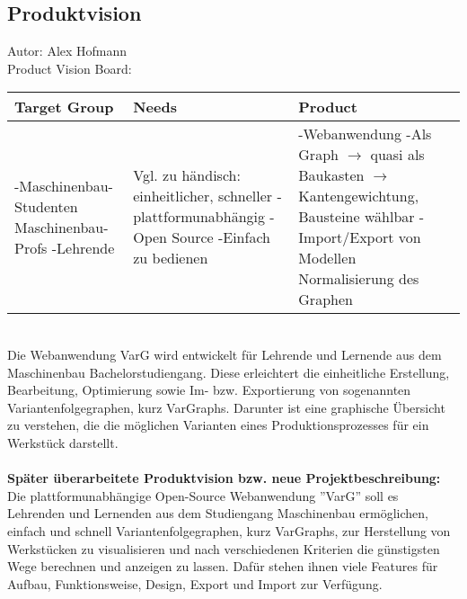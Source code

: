 \documentclass[twoside]{report}
\begin{document}
\subsection{Produktvision}
{\small Autor: Alex Hofmann}
\\

\noindent Product Vision Board: \\
\begin{tabular}{|p{50mm}|p{50mm}|p{50mm}|}
  \hline
  \textbf{Target Group}                                                  & \textbf{Needs}                                                                                                                        & \textbf{Product}                                                                                                                                                                                                 \\
  \hline
  -Maschinenbau-Studenten \newline Maschinenbau-Profs \newline -Lehrende & Vgl. zu händisch: \newline einheitlicher, schneller \newline -plattformunabhängig \newline -Open Source \newline -Einfach zu bedienen & -Webanwendung \newline -Als Graph \newline $\rightarrow$ quasi als Baukasten \newline $\rightarrow$ Kantengewichtung, Bausteine wählbar \newline -Import/Export von Modellen \newline Normalisierung des Graphen \\
  \hline
\end{tabular}
\\

\noindent Die Webanwendung VarG wird entwickelt für Lehrende und Lernende aus dem Maschinenbau Bachelorstudiengang.
Diese erleichtert die einheitliche Erstellung, Bearbeitung, Optimierung sowie Im- bzw. Exportierung von sogenannten Variantenfolgegraphen, kurz VarGraphs. Darunter ist eine graphische Übersicht zu verstehen, die die möglichen Varianten eines Produktionsprozesses für ein Werkstück darstellt.
\\
\\\textbf{Später überarbeitete Produktvision bzw. neue Projektbeschreibung:}
\\Die plattformunabhängige Open-Source Webanwendung ''VarG'' soll es Lehrenden und Lernenden aus dem Studiengang Maschinenbau ermöglichen, einfach und schnell Variantenfolgegraphen, kurz VarGraphs, zur Herstellung von Werkstücken zu visualisieren und nach verschiedenen Kriterien die günstigsten Wege berechnen und anzeigen zu lassen. Dafür stehen ihnen viele Features für Aufbau, Funktionsweise, Design, Export und Import zur Verfügung.
\end{document}
